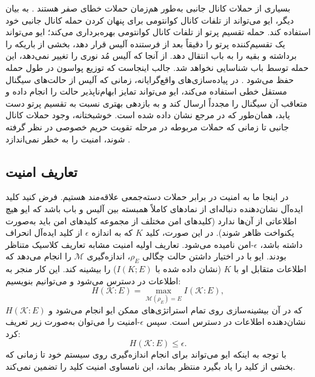 بسیاری از حملات کانال جانبی به‌طور هم‌زمان حملات خطای صفر هستند \cite{7-46}. به بیان دیگر، ایو می‌تواند از تلفات کانال کوانتومی برای پنهان کردن حمله کانال جانبی خود استفاده کند. حمله تقسیم پرتو از تلفات کانال کوانتومی بهره‌برداری می‌کند؛ ایو می‌تواند یک تقسیم‌کننده پرتو را دقیقاً بعد از فرستنده آلیس قرار دهد، بخشی از باریکه را برداشته و بقیه را به باب انتقال دهد. از آنجا که آلیس مُد نوری را تغییر نمی‌دهد، این حمله توسط باب شناسایی نخواهد شد. جالب اینجاست که توزیع پواسون در طول حمله  حفظ می‌شود \cite{7-56}. در پیاده‌سازی‌های واقع‌گرایانه، زمانی که آلیس از حالت‌های سیگنال مستقل خطی استفاده می‌کند، ایو می‌تواند تمایز ابهام‌ناپذیر حالت را انجام داده و متعاقب آن سیگنال را مجدداً ارسال کند و به بازدهی بهتری نسبت به تقسیم پرتو دست یابد، همان‌طور که در مرجع \cite{7-57} نشان داده شده است. خوشبختانه، وجود حملات کانال جانبی تا زمانی که حملات مربوطه در مرحله تقویت حریم خصوصی در نظر گرفته شوند، امنیت را به خطر نمی‌اندازد \cite{7-46}.

\subsection{تعاریف امنیت}
\label{sec:7-4-2}
در اینجا ما به امنیت در برابر حملات دسته‌جمعی علاقه‌مند هستیم. فرض کنید کلید ایده‌آل نشان‌دهنده دنباله‌ای از نمادهای کاملاً همبسته بین آلیس و باب باشد که ایو هیچ اطلاعاتی از آن‌ها ندارد (کلیدهای امن مختلف از مجموعه کلیدهای امن باید به‌صورت یکنواخت ظاهر شوند). در این صورت، کلید $K$ که به اندازه $\epsilon$ از کلید ایده‌آل انحراف داشته باشد، $\epsilon$-امن نامیده می‌شود. تعاریف اولیه امنیت  مشابه تعاریف کلاسیک متناظر بودند. ایو با در اختیار داشتن حالت چگالی $\rho_E$، اندازه‌گیری $\mathcal{M}$ را انجام می‌دهد که اطلاعات متقابل او با $K$ (نشان داده شده با $I(K;E)$) را بیشینه کند. این کار منجر به اطلاعات در دسترس می‌شود و می‌توانیم بنویسیم:
\begin{equation}
	H(\mathcal{K} : E) = \max_{\mathcal{M}(\rho_E)=E} I(\mathcal{K} : E),
	\label{eq:7-38}
\end{equation}
که در آن بیشینه‌سازی روی تمام استراتژی‌های ممکن ایو انجام می‌شود و $H(\mathcal{K} : E)$ نشان‌دهنده اطلاعات در دسترس است. سپس $\epsilon$-امنیت را می‌توان به‌صورت زیر تعریف کرد:
\begin{equation}
	H(\mathcal{K} : E) \leq \epsilon.
	\label{eq:7-39}
\end{equation}
با توجه به اینکه ایو می‌تواند برای انجام اندازه‌گیری روی سیستم خود تا زمانی که بخشی از کلید را یاد بگیرد منتظر بماند، این نامساوی امنیت کلید را تضمین نمی‌کند.

